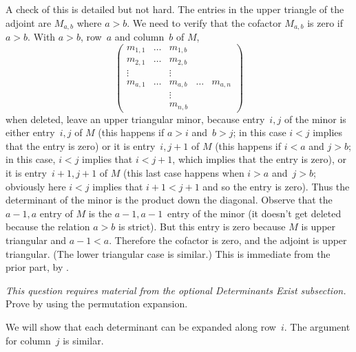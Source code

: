\begin{exercises}
\begin{answer}
\begin{exparts}
          A check of this is detailed but not hard.
          The entries in the upper triangle of the adjoint are 
          $M_{a,b}$ where $a>b$.
          We need to verify that the cofactor $M_{a,b}$ is zero if  $a>b$.
          With $a>b$, row~$a$ and column~$b$ of $M$, 
          \begin{equation*}
            \begin{pmatrix}
              m_{1,1} &\ldots   &m_{1,b}  &       &        \\
              m_{2,1} &\ldots   &m_{2,b}  &       &        \\
              \vdots  &         &\vdots   &       &        \\
              m_{a,1} &\ldots   &m_{a,b}  &\ldots &m_{a,n} \\
                      &         &\vdots   &       &        \\
                      &         &m_{n,b}  &       &                   
            \end{pmatrix}
          \end{equation*}
          when deleted, leave an upper triangular minor,
          because entry~$i,j$ of the minor is either entry~$i,j$ of
          $M$ (this happens if $a>i$ and~$b>j$;
          in this case $i<j$ implies that the entry is zero)
          or it is entry~$i,j+1$ of $M$ (this happens if $i<a$ and
          $j>b$; in this case, $i<j$ implies that $i<j+1$, which implies
          that the entry is zero), or it is entry~$i+1,j+1$ of $M$
          (this last case happens when $i>a$ and~$j>b$; obviously here
          $i<j$ implies that $i+1<j+1$ and so the entry is zero). 
          Thus the determinant of the minor is the product down the
          diagonal.
          Observe that the $a-1,a$ entry of $M$ is the
          $a-1,a-1$~entry of the minor (it doesn't get
          deleted because the relation $a>b$ is strict).
          But this entry is zero because $M$ is upper triangular and 
          $a-1<a$.
          Therefore the cofactor is zero, and the adjoint is upper triangular.
          (The lower triangular case is similar.)  
        \partsitem This is immediate from the prior part, by
          .
      \end{exparts}
    \end{answer}
  \item 
    \label{exer:LaplaceProof}
    \textit{This question requires material from the optional Determinants
       Exist subsection.}
    Prove 
    by using the permutation expansion.
    \begin{answer}
      We will show that each determinant can be expanded along 
      row~\( i \).
      The argument for column~$j$ is similar.


\end{answer}
\end{exercises}
